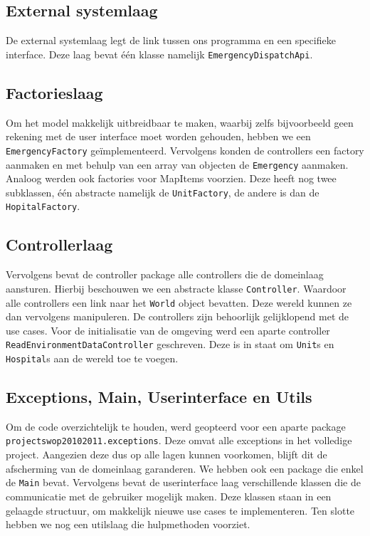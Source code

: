 \subsection{External systemlaag}
De external systemlaag legt de link tussen ons programma en een specifieke interface. Deze laag bevat \'e\'en klasse namelijk \texttt{EmergencyDispatchApi}.
\subsection{Factorieslaag}
Om het model makkelijk uitbreidbaar te maken, waarbij zelfs bijvoorbeeld geen rekening met de user interface moet worden gehouden, hebben we een \texttt{EmergencyFactory} ge\"implementeerd. Vervolgens konden de controllers een factory aanmaken en met behulp van een array van objecten de \texttt{Emergency} aanmaken. Analoog werden ook factories voor MapItems voorzien. Deze heeft nog twee subklassen, \'e\'en abstracte namelijk de \texttt{UnitFactory}, de andere is dan de \texttt{HopitalFactory}. 
\subsection{Controllerlaag}
Vervolgens bevat de controller package alle controllers die de domeinlaag aansturen. Hierbij beschouwen we een abstracte klasse \texttt{Controller}. Waardoor alle controllers een link naar het \texttt{World} object bevatten. Deze wereld kunnen ze dan vervolgens manipuleren. De controllers zijn behoorlijk gelijklopend met de use cases. Voor de initialisatie van de omgeving werd een aparte controller \texttt{ReadEnvironmentDataController} geschreven. Deze is in staat om \texttt{Unit}s en \texttt{Hospital}s aan de wereld toe te voegen.
\subsection{Exceptions, Main, Userinterface en Utils}
Om de code overzichtelijk te houden, werd geopteerd voor een aparte package \texttt{projectswop20102011.\-exceptions}. Deze omvat alle exceptions in het volledige project. Aangezien deze dus op alle lagen kunnen voorkomen, blijft dit de afscherming van de domeinlaag garanderen. We hebben ook een package die enkel de \texttt{Main} bevat. Vervolgens bevat de userinterface laag verschillende klassen die de communicatie met de gebruiker mogelijk maken. Deze klassen staan in een gelaagde structuur, om makkelijk nieuwe use cases te implementeren. Ten slotte hebben we nog een utilslaag die hulpmethoden voorziet.
